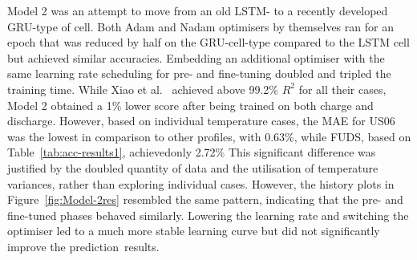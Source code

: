 %
%
Model 2 was an attempt to move from an old LSTM- to a recently developed GRU-type of cell.
Both Adam and Nadam optimisers by themselves ran for an epoch that was reduced by half on the GRU-cell-type compared to the LSTM cell but achieved similar accuracies.
Embedding an additional optimiser with the same learning rate scheduling for pre- and fine-tuning doubled and tripled the training time.
While Xiao et al.~\cite{xiao_accurate_2019} achieved above 99.2\% $R^2$ for all their cases, Model 2 obtained a 1\% lower score after being trained on both charge and discharge.
However, based on individual temperature cases, the MAE for US06 was the lowest in comparison to other profiles, with 0.63\%, while FUDS, based on Table~\ref{tab:acc-results1}, achieved\linebreak only 2.72\%
This significant difference was justified by the doubled quantity of data and the utilisation of temperature variances, rather than exploring individual cases.
However, the history plots in Figure~\ref{fig:Model-2res} resembled the same pattern, indicating that the pre- and fine-tuned phases behaved similarly.
Lowering the learning rate and switching the optimiser led to a much more stable learning curve but did not significantly improve the prediction~results.


